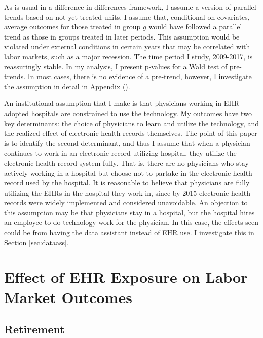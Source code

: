 \documentclass[11pt]{article}
\begin{document}
As is usual in a difference-in-differences framework, I assume a version of parallel trends based on not-yet-treated units. I assume that, conditional on covariates, average outcomes for those treated in group $g$ would have followed a parallel trend as those in groups treated in later periods. This assumption would be violated under external conditions in certain years that may be correlated with labor markets, such as a major recession. The time period I study, 2009-2017, is reassuringly stable. In my analysis, I present p-values for a Wald test of pre-trends. In most cases, there is no evidence of a pre-trend, however, I investigate the assumption in detail in Appendix (). 

An institutional assumption that I make is that physicians working in EHR-adopted hospitals are constrained to use the technology. My outcomes have two key determinants: the choice of physicians to learn and utilize the technology, and the realized effect of electronic health records themselves. The point of this paper is to identify the second determinant, and thus I assume that when a physician continues to work in an electronic record utilizing-hospital, they utilize the electronic health record system fully. That is, there are no physicians who stay actively working in a hospital but choose not to partake in the electronic health record used by the hospital. It is reasonable to believe that physicians are fully utilizing the EHRs in the hospital they work in, since by 2015 electronic health records were widely implemented and considered unavoidable. An objection to this assumption may be that physicians stay in a hospital, but the hospital hires an employee to do technology work for the physician. In this case, the effects seen could be from having the data assistant instead of EHR use. I investigate this in Section \ref{sec:dataass}.







\section{Effect of EHR Exposure on Labor Market Outcomes}

\subsection{Retirement}
\end{document}
